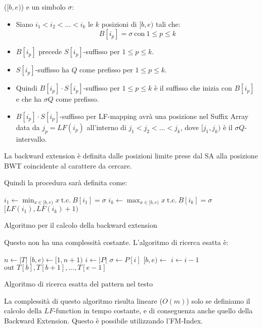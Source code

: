 ($[b, e)$) e un simbolo $\sigma$:
\begin{itemize}
    \item Siano $i_1 < i_2 < \dots < i_k$ le $k$ posizioni di $[b,e)$ tali che:
          \begin{equation}
              B[i_p] = \sigma \ \text{con} \ 1 \leq p \leq k
          \end{equation}
    \item $B[i_p]$ precede $S[i_p]$-suffisso per $1 \leq p \leq k$.
    \item $S[i_p]$-suffisso ha $Q$ come prefisso per $1 \leq p \leq k$.
    \item Quindi $B[i_p] \cdot S[i_p]$-suffisso per $1\le p \le k$ è il suffisso
          che inizia con $B[i_p]$ e che ha $\sigma Q$ come prefisso.
    \item $B[i_p] \cdot S[i_p]$-suffisso per LF-mapping avrà una posizione
          nel Suffix Array data da $j_p = LF(i_p)$ all'interno di $j_1 < j_2 <
              \dots < j_k$, dove $[j_1,j_k)$ è il $\sigma Q$-intervallo.
\end{itemize}
\begin{nota}
    La backward extension è definita dalle posizioni limite prese dal SA alla
    posizione BWT coincidente al carattere da cercare.
\end{nota}
Quindi la procedura sarà definita come:
\begin{algorithm}
    \begin{algorithmic}
        \State $i_1 \gets \min_{x\in [b,e)} x \ \text{t.c.} \ B[i_1] = \sigma$
        \State $i_k \gets \max_{x\in [b,e)} x \ \text{t.c.} \ B[i_k] = \sigma$
        \State \Return $[LF(i_1), LF(i_k)+1)$
        \EndFunction
    \end{algorithmic}
    \caption{Algoritmo per il calcolo della backward extension}
\end{algorithm}
Questo non ha una complessità costante. L'algoritmo di ricerca esatta è:
\begin{algorithm}
    \begin{algorithmic}
        \State $n \gets |T|$
        \State $[b,e) \gets [1, n+1)$
        \State $i \gets |P|$
        \While{$[b,e) \ \neq \ \text{null}\land i\ge 1$}
        \State $\sigma \gets P[i]$
        \State $[b,e) \gets$
        \State $i\gets i-1$
        \EndWhile
        \If{$[b,e)\ \neq \ \text{null}$}
        \State $\text{out } T[b], T[b+1], \dots, T[e-1]$
        \EndIf
        \EndFunction
    \end{algorithmic}
    \caption{Algoritmo di ricerca esatta del pattern nel testo}
\end{algorithm}
La complessità di questo algoritmo risulta lineare ($O(m)$) solo se definiamo il
calcolo della $LF$-function in tempo costante, e di conseguenza anche quello della
Backward Extension. Questo è possibile utilizzando l'FM-Index.
